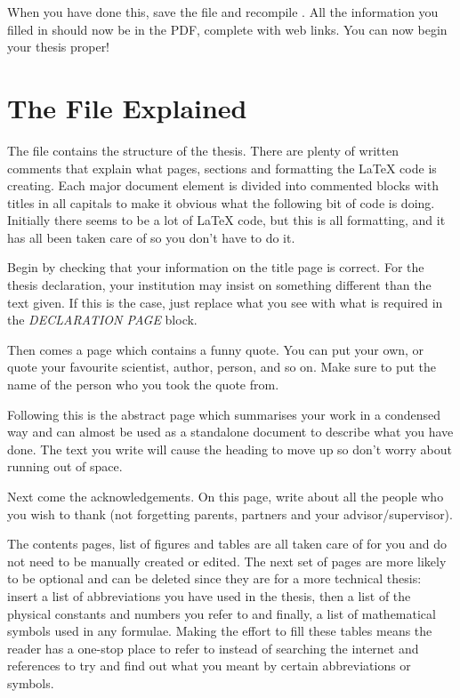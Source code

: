 \documentclass[
12pt, %
english, %
doublespacing, %
nolistspacing, %
liststotoc, %
headsepline, %
chapterinoneline, %
openany, %
]{DoctoralThesis}\usepackage[]{graphicx}\usepackage[]{color}
\begin{document}
When you have done this, save the file and recompile . All the information you filled in should now be in the PDF, complete with web links. You can now begin your thesis proper!


\section{The  File Explained}

The  file contains the structure of the thesis. There are plenty of written comments that explain what pages, sections and formatting the \LaTeX{} code is creating. Each major document element is divided into commented blocks with titles in all capitals to make it obvious what the following bit of code is doing. Initially there seems to be a lot of \LaTeX{} code, but this is all formatting, and it has all been taken care of so you don't have to do it.

Begin by checking that your information on the title page is correct. For the thesis declaration, your institution may insist on something different than the text given. If this is the case, just replace what you see with what is required in the \emph{DECLARATION PAGE} block.

Then comes a page which contains a funny quote. You can put your own, or quote your favourite scientist, author, person, and so on. Make sure to put the name of the person who you took the quote from.

Following this is the abstract page which summarises your work in a condensed way and can almost be used as a standalone document to describe what you have done. The text you write will cause the heading to move up so don't worry about running out of space.

Next come the acknowledgements. On this page, write about all the people who you wish to thank (not forgetting parents, partners and your advisor/supervisor).

The contents pages, list of figures and tables are all taken care of for you and do not need to be manually created or edited. The next set of pages are more likely to be optional and can be deleted since they are for a more technical thesis: insert a list of abbreviations you have used in the thesis, then a list of the physical constants and numbers you refer to and finally, a list of mathematical symbols used in any formulae. Making the effort to fill these tables means the reader has a one-stop place to refer to instead of searching the internet and references to try and find out what you meant by certain abbreviations or symbols.
\end{document}
